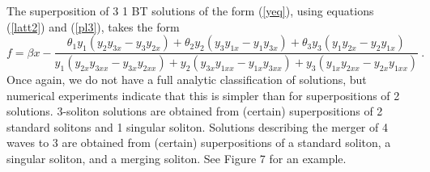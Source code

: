 \documentclass[12pt]{article}
\begin{document}




The superposition of $3$ 1 BT solutions of the form (\ref{yeq}), using equations (\ref{latt2}) and (\ref{pl3}),  
takes the form
\begin{equation}
f = \beta x  - 
\frac
{ \theta_1 y_1( y_2 y_{3x} - y_3 y_{2x}) 
+ \theta_2 y_2( y_3 y_{1x} - y_1 y_{3x})
+ \theta_3 y_3( y_1 y_{2x} - y_2 y_{1x} )
}
{
  y_1( y_{2x} y_{3xx} - y_{3x}y_{2xx} )
  + y_2( y_{3x} y_{1xx} - y_{1x}y_{3xx} ) 
  + y_3( y_{1x} y_{2xx} - y_{2x} y_{1xx}  ) 
} \ .  \label{3bt}
\end{equation}
Once again, we do not have a full analytic classification of solutions, but numerical experiments indicate that
this is simpler than for superpositions of 2 solutions. 3-soliton solutions  are obtained from (certain) superpositions of
2 standard solitons and 1 singular soliton. Solutions describing the merger of 4 waves to 3 are obtained from (certain)
superpositions of a standard soliton, a singular soliton, and a merging soliton. See
Figure 7 for an example. 
\end{document}
